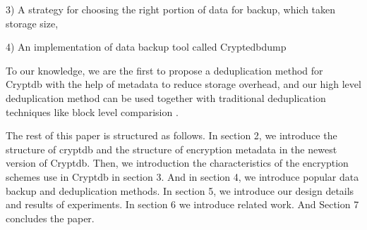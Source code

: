 3) A strategy for choosing the right portion of data for backup, which taken storage size, 

4) An implementation of data backup tool called Cryptedbdump 

To our knowledge, we are the first to propose a deduplication method for Cryptdb with the help of metadata to reduce storage overhead, and our high level deduplication method can be used together with traditional deduplication techniques like block level comparision \citep{bellare2013message}.

The rest of this paper is structured as follows. In section 2, we introduce the structure of cryptdb and the structure of encryption metadata in the newest version of Cryptdb. Then, we introduction the characteristics of the encryption schemes use in Cryptdb in section 3. And in section 4, we introduce popular data backup and deduplication methods. In section 5, we introduce our design details and results of experiments. In section 6 we introduce related work. And Section 7 concludes the paper.


